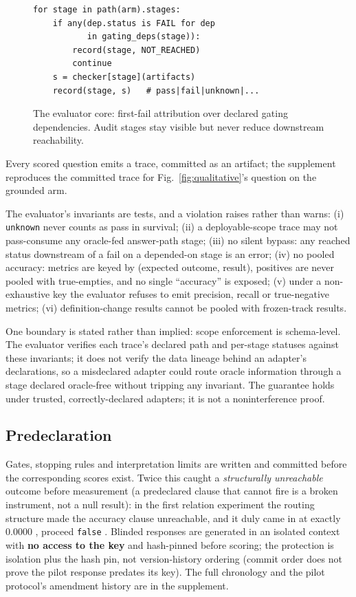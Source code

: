 \begin{figure}[t]
  \footnotesize
\begin{verbatim}
for stage in path(arm).stages:
    if any(dep.status is FAIL for dep
           in gating_deps(stage)):
        record(stage, NOT_REACHED)
        continue
    s = checker[stage](artifacts)
    record(stage, s)   # pass|fail|unknown|...
\end{verbatim}
  \vspace{-0.5em}
  \caption{The evaluator core: first-fail attribution over declared gating
  dependencies. Audit stages stay visible but never reduce downstream reachability.}
  \label{fig:algo}
\end{figure}

Every scored question emits a trace, committed as an artifact; the supplement
reproduces the committed trace for Fig.~\ref{fig:qualitative}'s question on the
grounded arm.

The evaluator's invariants are tests, and a violation raises rather than warns:
(i) \texttt{unknown} never counts as pass in survival;
(ii) a deployable-scope trace may not pass-consume any oracle-fed answer-path stage;
(iii) no silent bypass: any reached status downstream of a fail on a depended-on
stage is an error;
(iv) no pooled accuracy: metrics are keyed by (expected outcome, result), positives
are never pooled with true-empties, and no single ``accuracy'' is exposed;
(v) under a non-exhaustive key the evaluator refuses to emit precision, recall or
true-negative metrics;
(vi) definition-change results cannot be pooled with frozen-track results.

One boundary is stated rather than implied: scope enforcement is schema-level. The
evaluator verifies each trace's declared path and per-stage statuses against these
invariants; it does not verify the data lineage behind an adapter's declarations, so a
misdeclared adapter could route oracle information through a stage declared oracle-free
without tripping any invariant. The guarantee holds under trusted, correctly-declared
adapters; it is not a noninterference proof.

\subsection{Predeclaration}

Gates, stopping rules and interpretation limits are written and committed before the
corresponding scores exist. Twice this caught a \emph{structurally unreachable} outcome
before measurement (a predeclared clause that cannot fire is a broken instrument, not
a null result): in the first relation experiment the routing structure made the accuracy
clause unreachable, and it duly came in at exactly $0.0000$ , proceed
\texttt{false} . Blinded responses are generated in an isolated
context with \textbf{no access to the key} and hash-pinned before scoring; the
protection is isolation plus the hash pin, not version-history ordering (commit order
does not prove the pilot response predates its key). The full chronology and the pilot
protocol's amendment history are in the supplement.


